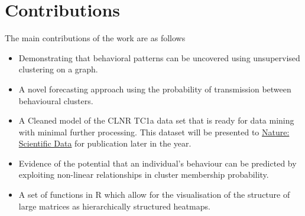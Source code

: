 \section{Contributions}
The main contributions of the work are as follows
\begin{itemize}
\itemsep0em 
    \item Demonstrating that behavioral patterns can be uncovered using unsupervised clustering on a graph.
    \item A novel forecasting approach using the probability of transmission between behavioural clusters.
    \item A Cleaned model of the CLNR TC1a data set that is ready for data mining with minimal further processing. This dataset will be presented to \href{http://www.nature.com/sdata/about}{Nature: Scientific Data} for publication later in the year.
    \item Evidence of the potential that an individual's behaviour can be predicted by exploiting non-linear relationships in cluster membership probability.
    \item A set of functions in R which allow for the visualisation of the structure of large matrices as hierarchically structured heatmaps.
\end{itemize}


